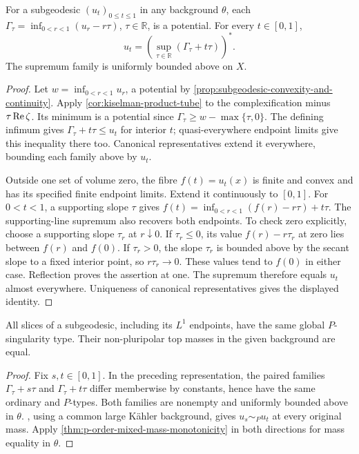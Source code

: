 \begin{lemma}\label{lem:subgeodesic-finite-legendre-representation}
For a subgeodesic $(u_t)_{0\leq t\leq1}$ in any background $\theta$, each $\Gamma_\tau=\inf_{0<r<1}(u_r-r\tau)$, $\tau\in\mathbb R$, is a potential. For every $t\in[0,1]$,
\[
 u_t=\left(\sup_{\tau\in\mathbb R}(\Gamma_\tau+t\tau)\right)^*.
\]
The supremum family is uniformly bounded above on $X$.
\end{lemma}
\begin{proof}
Let $w=\inf_{0<r<1}u_r$, a potential by \cref{prop:subgeodesic-convexity-and-continuity}. Apply \cref{cor:kiselman-product-tube} to the complexification minus $\tau\operatorname{Re}\zeta$. Its minimum is a potential since $\Gamma_\tau\geq w-\max\{\tau,0\}$. The defining infimum gives $\Gamma_\tau+t\tau\leq u_t$ for interior $t$; quasi-everywhere endpoint limits give this inequality there too. Canonical representatives extend it everywhere, bounding each family above by $u_t$.

Outside one set of volume zero, the fibre $f(t)=u_t(x)$ is finite and convex and has its specified finite endpoint limits. Extend it continuously to $[0,1]$. For $0<t<1$, a supporting slope $\tau$ gives
$f(t)=\inf_{0<r<1}(f(r)-r\tau)+t\tau$.
The supporting-line supremum also recovers both endpoints. To check zero explicitly, choose a supporting slope $\tau_r$ at $r\downarrow0$. If $\tau_r\leq0$, its value $f(r)-r\tau_r$ at zero lies between $f(r)$ and $f(0)$. If $\tau_r>0$, the slope $\tau_r$ is bounded above by the secant slope to a fixed interior point, so $r\tau_r\to0$. These values tend to $f(0)$ in either case. Reflection proves the assertion at one. The supremum therefore equals $u_t$ almost everywhere. Uniqueness of canonical representatives gives the displayed identity.
\end{proof}

\begin{theorem}\label{thm:subgeodesic-p-type-invariance}
All slices of a subgeodesic, including its $L^1$ endpoints, have the same global $P$-singularity type. Their non-pluripolar top masses in the given background are equal.
\end{theorem}
\begin{proof}
Fix $s,t\in[0,1]$. In the preceding representation, the paired families
$\Gamma_\tau+s\tau$ and $\Gamma_\tau+t\tau$ differ memberwise by constants, hence have the same ordinary and $P$-types. Both families are nonempty and uniformly bounded above in $\theta$. , using a common large K\"ahler background, gives $u_s\sim_P u_t$ at every original mass. Apply \cref{thm:p-order-mixed-mass-monotonicity} in both directions for mass equality in $\theta$.
\end{proof}


